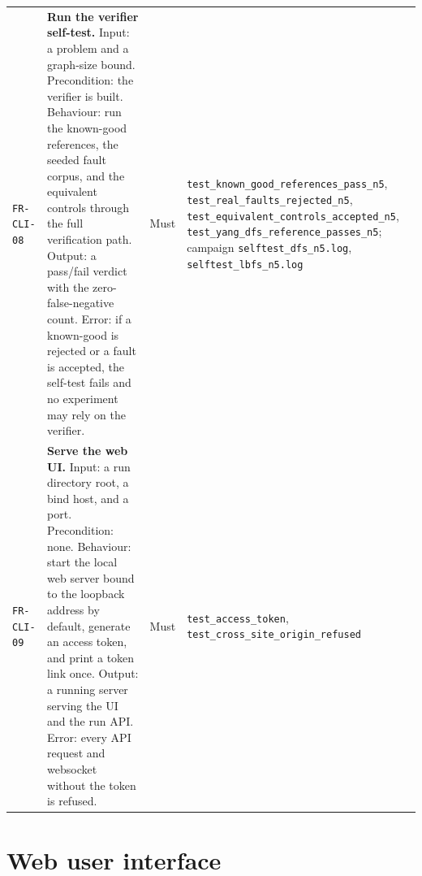 \begin{longtable}{@{}>{\raggedright\arraybackslash}p{}>{\raggedright\arraybackslash}p{}p{}>{\raggedright\arraybackslash}p{}@{}}
\texttt{FR-CLI-08} & \textbf{Run the verifier self-test.} Input: a problem and a
graph-size bound. Precondition: the verifier is built. Behaviour: run the
known-good references, the seeded fault corpus, and the equivalent controls
through the full verification path. Output: a pass/fail verdict with the
zero-false-negative count. Error: if a known-good is rejected or a fault is
accepted, the self-test fails and no experiment may rely on the verifier. & Must &
\texttt{test\_known\_good\_references\_pass\_n5},
\texttt{test\_real\_faults\_rejected\_n5},
\texttt{test\_equivalent\_controls\_accepted\_n5},
\texttt{test\_yang\_dfs\_reference\_passes\_n5}; campaign
\texttt{selftest\_dfs\_n5.log}, \texttt{selftest\_lbfs\_n5.log} \\
\addlinespace[2pt]

\texttt{FR-CLI-09} & \textbf{Serve the web UI.} Input: a run directory root, a
bind host, and a port. Precondition: none. Behaviour: start the local web server
bound to the loopback address by default, generate an access token, and print a
token link once. Output: a running server serving the UI and the run API. Error:
every API request and websocket without the token is refused. & Must &
\texttt{test\_access\_token}, \texttt{test\_cross\_site\_origin\_refused} \\
\bottomrule
\end{longtable}

\section{Web user interface}
\label{sec:fr-ui}

